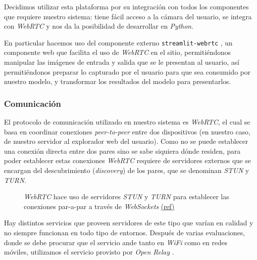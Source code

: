 \documentclass[a4paper]{article}
\begin{document}
Decidimos utilizar esta plataforma por su integración con todos los componentes que requiere nuestro sistema: tiene fácil acceso a la cámara del usuario, se integra con \textit{WebRTC} y nos da la posibilidad de desarrollar en \textit{Python}.

En particular hacemos uso del componente externo \texttt{streamlit-webrtc} \cite{streamlit-webrtc}, un componente web que facilita el uso de \textit{WebRTC} en el sitio, permitiéndonos manipular las imágenes de entrada y salida que se le presentan al usuario, así permitiéndonos preparar lo capturado por el usuario para que sea consumido por nuestro modelo, y transformar los resultados del modelo para presentarlos.

\subsubsection{Comunicación}

El protocolo de comunicación utilizado en nuestro sistema es \textit{WebRTC}, el cual se basa en coordinar conexiones \textit{peer-to-peer} entre dos dispositivos (en nuestro caso, de nuestro servidor al explorador web del usuario). Como no se puede establecer una conexión directa entre dos pares sino se sabe siquiera dónde residen, para poder establecer estas conexiones \textit{WebRTC} requiere de servidores externos que se encargan del descubrimiento (\textit{discovery}) de los pares, que se denominan \textit{STUN} y \textit{TURN}.

\begin{figure}[H]
\caption{\textit{WebRTC} hace uso de servidores \textit{STUN} y \textit{TURN} para establecer las conexiones par-a-par a través de \textit{WebSockets} \scriptsize{\href{https://medium.com/dvt-engineering/introduction-to-webrtc-cad0c6900b8e}{(ref)}}}
\end{figure}

Hay distintos servicios que proveen servidores de este tipo que varían en calidad y no siempre funcionan en todo tipo de entornos. Después de varias evaluaciones, donde se debe procurar que el servicio ande tanto en \textit{WiFi} como en redes móviles, utilizamos el servicio provisto por \textit{Open Relay} \cite{openrelay}.
\end{document}
